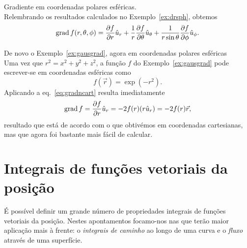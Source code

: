 \begin{examples}
\item Gradiente em coordenadas polares esféricas.\\
Relembrando os resultados calculados no Exemplo~\ref{ex:drsph}, obtemos
\begin{equation*}
\text{grad}\, f(r,\theta,\phi)=\frac{\partial f}{\partial r}\hat u_r+\frac{1}{r}\frac{\partial f}{\partial \theta}\hat u_\theta
+\frac{1}{r\sin\theta}\frac{\partial f}{\partial \phi}\hat u_\phi.
\end{equation*}

\item De novo o Exemplo~\ref{ex:gausgrad}, agora em coordenadas polares
esféricas\\
Uma vez que $r^2=x^2+y^2+z^2$, a função $f$ do Exemplo~\ref{ex:gausgrad} pode
escrever-se em coordenadas esféricas como
\begin{equation*}
f(\vec r)=\exp(-r^2).
\end{equation*}
Aplicando a eq.~\eqref{eq:gradncart} resulta imediatamente
\begin{equation*}
\grad f=\pd{f}{r}\hat u_r=-2f(r)(r\hat u_r)=-2f(r)\vec r,
\end{equation*}
resultado que está de acordo com o que obtivémos em coordenadas cartesianas, mas
que agora foi bastante mais fácil de calcular.
\end{examples}

\section{Integrais de funções vetoriais da posição}
É possível definir um grande número de propriedades integrais de funções
vetoriais da posição. Nestes apontamentos focamo-nos nas que terão maior aplicação
mais à frente: o \emph{integrais de caminho} ao longo de uma curva e o
\emph{fluxo} através de uma superfície.


